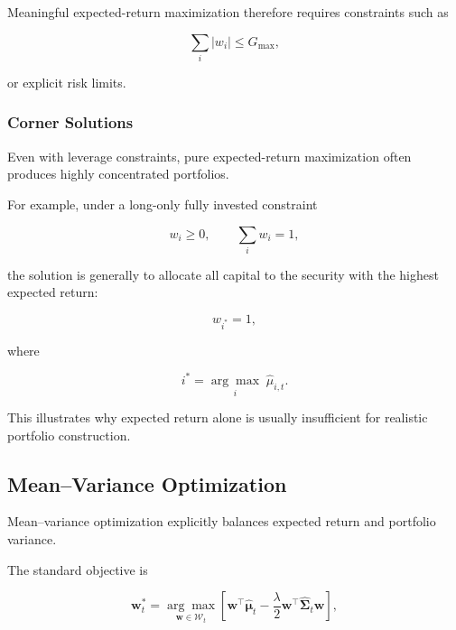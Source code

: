 \documentclass[11pt,a4paper]{article}
\begin{document}
Meaningful expected-return maximization therefore requires constraints such as

\begin{equation}
\sum_i |w_i|
\leq
G_{\max},
\end{equation}

or explicit risk limits.


\subsubsection{Corner Solutions}

Even with leverage constraints, pure expected-return maximization often produces
highly concentrated portfolios.

For example, under a long-only fully invested constraint

\begin{equation}
w_i\geq0,
\qquad
\sum_iw_i=1,
\end{equation}

the solution is generally to allocate all capital to the security with the
highest expected return:

\begin{equation}
w_{i^*}=1,
\end{equation}

where

\begin{equation}
i^*
=
\underset{i}{\arg\max}
\;
\widehat{\mu}_{i,t}.
\end{equation}

This illustrates why expected return alone is usually insufficient for
realistic portfolio construction.


\subsection{Mean--Variance Optimization}
\label{subsec:mean_variance_optimization}

Mean--variance optimization explicitly balances expected return and portfolio
variance.

The standard objective is

\begin{equation}
\boxed{
\mathbf{w}_t^{*}
=
\underset{\mathbf{w}\in\mathcal{W}_t}{\arg\max}
\left[
\mathbf{w}^{\top}
\widehat{\boldsymbol{\mu}}_t
-
\frac{\lambda}{2}
\mathbf{w}^{\top}
\widehat{\boldsymbol{\Sigma}}_t
\mathbf{w}
\right],
}
\end{equation}
\end{document}
